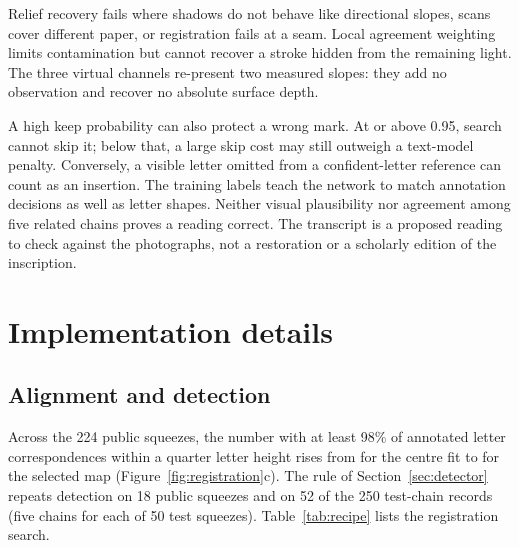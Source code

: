\documentclass[11pt]{article}
\begin{document}
Relief recovery fails where shadows do not behave like directional slopes, scans cover different paper,
or registration fails at a seam. Local agreement weighting limits contamination but cannot recover a
stroke hidden from the remaining light. The three virtual channels re-present two measured slopes: they
add no observation and recover no absolute surface depth.

A high keep probability can also protect a wrong mark. At or above 0.95, search cannot skip it; below that,
a large skip cost may still outweigh a text-model penalty. Conversely, a visible letter omitted from a
confident-letter reference can count as an insertion. The training labels teach the network to
match annotation decisions as well as letter shapes. Neither visual plausibility nor agreement among
five related chains proves a reading correct. The transcript is a proposed reading to check against the
photographs, not a restoration or a scholarly edition of the inscription.

\clearpage
\appendix
\section{Implementation details}
\label{app:recipe}
\subsection{Alignment and detection}
\label{app:align}
Across the 224 public squeezes, the number with at least 98\% of annotated letter correspondences within a
quarter letter height rises from \RegPassOld{} for the centre fit to \RegPassNew{} for the selected map
(Figure~\ref{fig:registration}c). The rule of Section~\ref{sec:detector} repeats detection on 18 public
squeezes and on 52 of the 250 test-chain records (five chains for each of 50 test squeezes).
Table~\ref{tab:recipe} lists the registration search.
\end{document}
